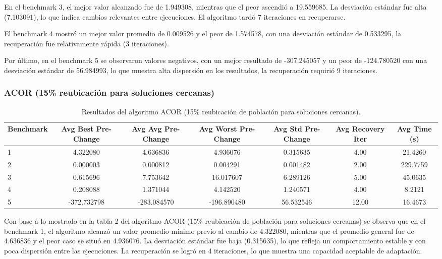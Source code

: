 \documentclass[10pt]{article}
\begin{document}
En el benchmark 3, el mejor valor alcanzado fue de 1.949308, mientras que el peor ascendió a 19.559685. La desviación estándar fue alta (7.103091), lo que indica cambios relevantes entre ejecuciones. El algoritmo tardó 7 iteraciones en recuperarse.

El benchmark 4 mostró un mejor valor promedio de 0.009526 y el peor de 1.574578, con una desviación estándar de 0.533295,  la recuperación fue relativamente rápida (3 iteraciones).

Por último, en el benchmark 5 se observaron valores negativos, con un mejor resultado de -307.245057 y un peor de -124.780520 con una desviación estándar de 56.984993, lo que muestra alta dispersión en los resultados, la recuperación requirió 9 iteraciones.

\subsubsection*{ACOR (15\% reubicación para soluciones cercanas)}
\begin{table}[H]
\centering
\caption{Resultados del algoritmo ACOR (15\% reubicación de población para soluciones cercanas).}
\label{tab:acor}
\scriptsize
\begin{tabular}{lcccccc}
\toprule
\textbf{Benchmark} & \textbf{Avg Best Pre-Change} & \textbf{Avg Avg Pre-Change} & \textbf{Avg Worst Pre-Change} & \textbf{Avg Std Pre-Change} & \textbf{Avg Recovery Iter} & \textbf{Avg Time (s)} \\
\midrule
1 & 4.322080 & 4.636836 & 4.936076 & 0.315635 & 4.00 & 21.4260 \\
2 & 0.000003 & 0.000812 & 0.004291 & 0.001482 & 2.00 & 229.7759 \\
3 & 0.615696 & 7.753642 & 16.017607 & 6.289126 & 5.00 & 45.0635 \\
4 & 0.208088 & 1.371044 & 4.142520 & 1.240571 & 4.00 & 8.2121 \\
5 & -372.732798 & -283.084570 & -196.890480 & 56.532546 & 12.00 & 16.4673 \\
\bottomrule
\end{tabular}
\end{table}

Con base a lo mostrado en la tabla 2 del algoritmo ACOR (15\% reubicación de población para soluciones cercanas) se observa que en el benchmark 1, el algoritmo alcanzó un valor promedio mínimo previo al cambio de 4.322080, mientras que el promedio general fue de 4.636836 y el peor caso se situó en 4.936076. La desviación estándar fue baja (0.315635), lo que refleja un comportamiento estable y con poca dispersión entre las ejecuciones. La recuperación se logró en 4 iteraciones, lo que muestra una capacidad aceptable de adaptación.
\end{document}
